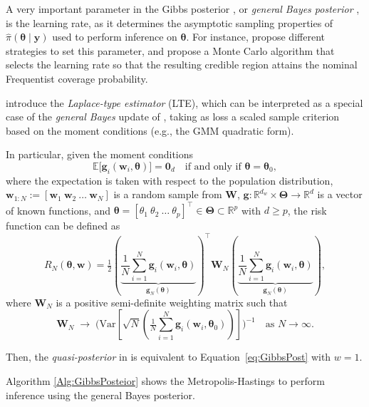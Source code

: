 A very important parameter in the Gibbs posterior \cite{Jiang2008}, or \textit{general Bayes posterior} \cite{bissiri2016general}, is the learning rate, as it determines the asymptotic sampling properties of $\hat{\pi}(\boldsymbol{\theta}\mid\mathbf{y})$ used to perform inference on $\boldsymbol{\theta}$. For instance, \cite{bissiri2016general} propose different strategies to set this parameter, and \cite{Syring2019} propose a Monte Carlo algorithm that selects the learning rate so that the resulting credible region attains the nominal Frequentist coverage probability.

\cite{chernozhukov2003mcmc} introduce the \emph{Laplace-type estimator} (LTE), which can be interpreted as a special case of the \emph{general Bayes} update of \cite{bissiri2016general}, taking as loss a scaled sample criterion based on the moment conditions (e.g., the GMM quadratic form).

In particular, given the moment conditions
\[
\mathbb{E}\!\big[\mathbf{g}_i(\mathbf{w}_i,\boldsymbol{\theta})\big]=\mathbf{0}_{d} 
\quad \text{if and only if } \boldsymbol{\theta}=\boldsymbol{\theta}_0,
\]
where the expectation is taken with respect to the population distribution, 
$\mathbf{w}_{1:N}:=[\mathbf{w}_1 \ \mathbf{w}_2 \ \dots \ \mathbf{w}_N]$ is a random sample from $\mathbf{W}$, 
$\mathbf{g}:\mathbb{R}^{d_w}\times\boldsymbol{\Theta}\to\mathbb{R}^{d}$ is a vector of known functions, and 
$\boldsymbol{\theta}=[\theta_{1}\ \theta_{2}\ \dots\ \theta_{p}]^{\top}\in\boldsymbol{\Theta}\subset\mathbb{R}^{p}$ with $d\geq p$, the risk function can be defined as
\[
R_N(\boldsymbol{\theta},\mathbf{w})=\tfrac{1}{2}\left(\underbrace{\frac{1}{N}\sum_{i=1}^N \mathbf{g}_i(\mathbf{w}_i,\boldsymbol{\theta})}_{\mathbf{g}_N(\boldsymbol{\theta})}\right)^{\top}\mathbf{W}_N\left(\underbrace{\frac{1}{N}\sum_{i=1}^N\mathbf{g}_i(\mathbf{w}_i,\boldsymbol{\theta})}_{\mathbf{g}_N(\boldsymbol{\theta})}\right),
\]
where $\mathbf{W}_N$ is a positive semi-definite weighting matrix such that
\[
\mathbf{W}_N \;\to\; 
\Bigg(\text{Var}\left[\sqrt{N}\left(\tfrac{1}{N}\sum_{i=1}^N \mathbf{g}_i(\mathbf{w}_i,\boldsymbol{\theta}_0)\right)\right]\Bigg)^{-1}
\quad \text{as } N\rightarrow \infty.
\]  

Then, the \textit{quasi-posterior} in \cite{chernozhukov2003mcmc} is equivalent to Equation~\ref{eq:GibbsPost} with $w=1$.

Algorithm \ref{Alg:GibbsPosteior} shows the Metropolis-Hastings to perform inference using the general Bayes posterior.

